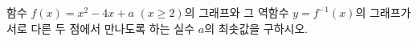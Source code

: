 함수 $f(x)=x^2-4x+a$ $(x\ge 2)$의 그래프와 그 역함수 $y=f^{-1}(x)$의 그래프가 서로 다른 두 점에서 만나도록 하는 실수 $a$의 최솟값을 구하시오.
